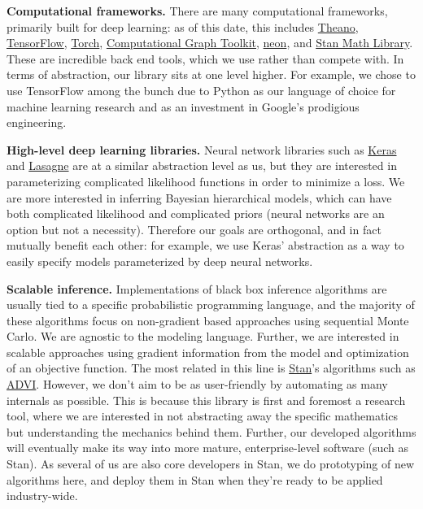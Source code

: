 \textbf{Computational frameworks.} There are many computational
frameworks, primarily built for deep learning: as of this date, this
includes \href{http://deeplearning.net/software/theano/}{Theano},
\href{https://www.tensorflow.org}{TensorFlow},
\href{http://torch.ch}{Torch},
\href{http://rll.berkeley.edu/cgt/}{Computational Graph Toolkit},
\href{https://github.com/NervanaSystems/neon}{neon}, and
\href{https://github.com/stan-dev/math}{Stan Math Library}. These are
incredible back end tools, which we use rather than compete with. In
terms of abstraction, our library sits at one level higher. For example,
we chose to use TensorFlow among the bunch due to Python as our language
of choice for machine learning research and as an investment in Google's
prodigious engineering.

\textbf{High-level deep learning libraries.} Neural network libraries
such as \href{https://github.com/fchollet/keras}{Keras} and
\href{https://github.com/Lasagne/Lasagne}{Lasagne} are at a similar
abstraction level as us, but they are interested in parameterizing
complicated likelihood functions in order to minimize a loss. We are
more interested in inferring Bayesian hierarchical models, which can
have both complicated likelihood and complicated priors (neural networks
are an option but not a necessity). Therefore our goals are orthogonal,
and in fact mutually benefit each other: for example, we use Keras'
abstraction as a way to easily specify models parameterized by deep
neural networks.

\textbf{Scalable inference.} Implementations of black box inference
algorithms are usually tied to a specific probabilistic programming
language, and the majority of these algorithms focus on non-gradient
based approaches using sequential Monte Carlo. We are agnostic to the
modeling language. Further, we are interested in scalable approaches
using gradient information from the model and optimization of an
objective function. The most related in this line is
\href{http://mc-stan.org}{Stan}'s algorithms such as
\href{http://arxiv.org/abs/1506.03431}{ADVI}. However, we don't aim to
be as user-friendly by automating as many internals as possible. This is
because this library is first and foremost a research tool, where we are
interested in not abstracting away the specific mathematics but
understanding the mechanics behind them. Further, our developed
algorithms will eventually make its way into more mature,
enterprise-level software (such as Stan). As several of us are also core
developers in Stan, we do prototyping of new algorithms here, and deploy
them in Stan when they're ready to be applied industry-wide.
